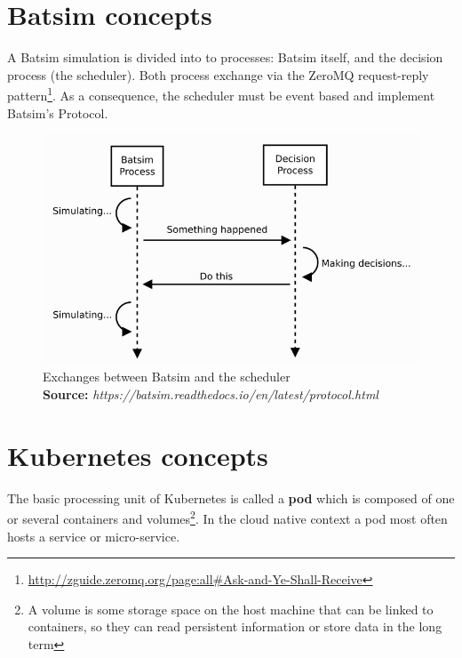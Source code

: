 \documentclass[12pt, a4paper]{memoir}
\newcommand*{\captionsource}[2]{%
    \caption[{#1}]{%
        #1%
        \\\hspace{\linewidth}%
	\textbf{Source:} \textit{#2}%
    }%
}
\begin{document}
\section{Batsim concepts}

A Batsim simulation is divided into to processes: Batsim itself, and the
decision process (the scheduler). Both process exchange via the ZeroMQ
request-reply
pattern\footnote{\url{http://zguide.zeromq.org/page:all\#Ask-and-Ye-Shall-Receive}}.
As a consequence, the scheduler must be event based and implement Batsim's
Protocol.

\begin{figure}[H]
	\centering
	\includegraphics[scale=0.5]{imgs/batsim-sequence-diag.png}
	\captionsource{Exchanges between Batsim and the scheduler}{https://batsim.readthedocs.io/en/latest/protocol.html}
	\label{fig:bati-seq-diag}
\end{figure}

\section{Kubernetes concepts}

The basic processing unit of Kubernetes is called a \textbf{pod} which is
composed of one or several containers and volumes\footnote{A volume is some
	storage space on the host machine that can be linked to containers, so
	they can read persistent information or store data in the long term}.
In the cloud native context a pod most often hosts a service or micro-service.
\end{document}
